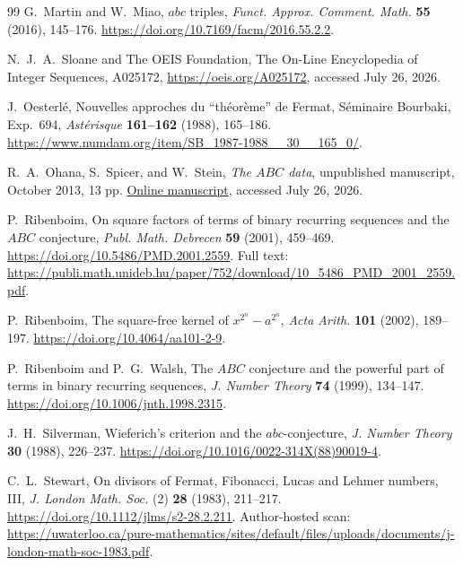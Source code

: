 \documentclass[11pt]{article}
\theoremstyle{remark}
\begin{document}
\begin{thebibliography}{99}
G.~Martin and W.~Miao,
\newblock \(abc\) triples,
\newblock \emph{Funct. Approx. Comment. Math.} \textbf{55} (2016),
145--176.
\newblock \url{https://doi.org/10.7169/facm/2016.55.2.2}.

N.~J.~A.~Sloane and The OEIS Foundation,
\newblock The On-Line Encyclopedia of Integer Sequences, A025172,
\newblock \url{https://oeis.org/A025172}, accessed July 26, 2026.

J.~Oesterl\'e,
\newblock Nouvelles approches du ``th\'eor\`eme'' de Fermat,
\newblock S\'eminaire Bourbaki, Exp.\ 694,
\emph{Ast\'erisque} \textbf{161--162} (1988), 165--186.
\newblock \url{https://www.numdam.org/item/SB_1987-1988__30__165_0/}.

R.~A.~Ohana, S.~Spicer, and W.~Stein,
\newblock \emph{The \(ABC\) data},
\newblock unpublished manuscript, October 2013, 13 pp.
\newblock
\href{https://cocalc.com/share/download/c1f4c5685b89bae0dfa24156574398b8c8172a3a/briefing/brief.pdf}
{Online manuscript}, accessed July 26, 2026.

P.~Ribenboim,
\newblock On square factors of terms of binary recurring sequences and
the \(ABC\) conjecture,
\newblock \emph{Publ. Math. Debrecen} \textbf{59} (2001), 459--469.
\newblock \url{https://doi.org/10.5486/PMD.2001.2559}.
\newblock Full text:
\url{https://publi.math.unideb.hu/paper/752/download/10_5486_PMD_2001_2559.pdf}.

P.~Ribenboim,
\newblock The square-free kernel of \(x^{2^n}-a^{2^n}\),
\newblock \emph{Acta Arith.} \textbf{101} (2002), 189--197.
\newblock \url{https://doi.org/10.4064/aa101-2-9}.

P.~Ribenboim and P.~G.~Walsh,
\newblock The \(ABC\) conjecture and the powerful part of terms in binary
recurring sequences,
\newblock \emph{J. Number Theory} \textbf{74} (1999), 134--147.
\newblock \url{https://doi.org/10.1006/jnth.1998.2315}.

J.~H.~Silverman,
\newblock Wieferich's criterion and the \(abc\)-conjecture,
\newblock \emph{J. Number Theory} \textbf{30} (1988), 226--237.
\newblock \url{https://doi.org/10.1016/0022-314X(88)90019-4}.

C.~L.~Stewart,
\newblock On divisors of Fermat, Fibonacci, Lucas and Lehmer numbers, III,
\newblock \emph{J. London Math. Soc.} (2) \textbf{28} (1983), 211--217.
\newblock \url{https://doi.org/10.1112/jlms/s2-28.2.211}.
\newblock Author-hosted scan:
\url{https://uwaterloo.ca/pure-mathematics/sites/default/files/uploads/documents/j-london-math-soc-1983.pdf}.


\end{thebibliography}
\end{document}
